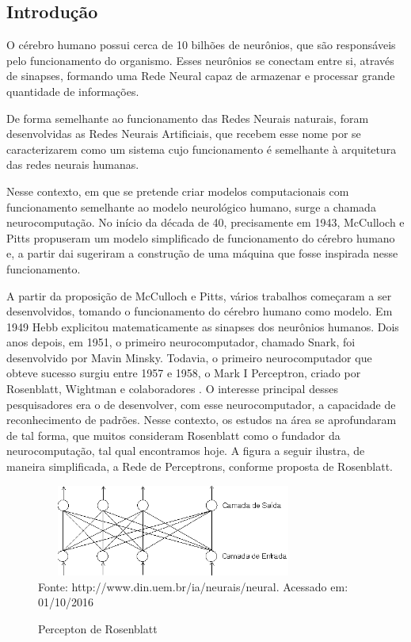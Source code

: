\subsection{Introdução}

O cérebro humano possui cerca de 10 bilhões de neurônios, que são responsáveis pelo funcionamento do organismo. 
Esses neurônios se conectam entre si, através de sinapses, formando uma Rede Neural capaz de armazenar e processar grande quantidade de informações.

De forma semelhante ao funcionamento das Redes Neurais naturais, foram desenvolvidas as Redes Neurais Artificiais, que recebem esse nome por se caracterizarem como um 
sistema cujo funcionamento é semelhante à arquitetura das redes neurais humanas.

Nesse contexto, em que se pretende criar modelos computacionais com funcionamento semelhante ao modelo neurológico humano, surge a chamada neurocomputação. 
No início da década de 40, precisamente em 1943, McCulloch e Pitts \cite{Heaton2008} propuseram um modelo simplificado de funcionamento do cérebro humano e, 
a partir dai sugeriram a construção de uma máquina que fosse inspirada nesse funcionamento.

A partir da proposição de McCulloch e Pitts, vários trabalhos começaram a ser desenvolvidos, tomando o funcionamento do cérebro humano como modelo. 
Em 1949 Hebb explicitou matematicamente as sinapses dos neurônios humanos. Dois anos depois, em 1951, o primeiro neurocomputador, 
chamado Snark, foi desenvolvido por Mavin Minsky. Todavia, o primeiro neurocomputador que obteve sucesso surgiu entre 1957 e 1958, 
o Mark I Perceptron, criado por Rosenblatt, Wightman e colaboradores \cite{Heaton2008}. O interesse principal desses pesquisadores era o de desenvolver, com esse neurocomputador, a capacidade de reconhecimento de padrões. Nesse contexto, os estudos na área se aprofundaram de tal forma, que muitos consideram Rosenblatt como o fundador da neurocomputação, tal qual encontramos hoje. 
A figura a seguir ilustra, de maneira simplificada, a Rede de Perceptrons, conforme proposta de Rosenblatt.

\begin{figure}[!ht]
\centering
\caption{Percepton de Rosenblatt}
\vspace{1mm}
\includegraphics[width=90mm, height=30mm]{Figuras/Neural/Rosenblatt.png}\\
\tiny Fonte: http://www.din.uem.br/ia/neurais/neural. Acessado em: 01/10/2016
\end{figure}


